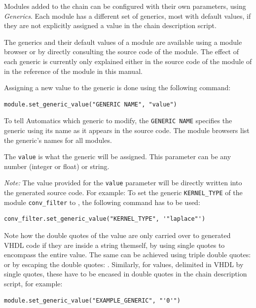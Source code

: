 Modules added to the chain can be configured with their own parameters, using \textit{Generics}.
Each module has a different set of generics, most with default values, if they are not explicitly assigned a value in the chain description script.

The generics and their default values of a module are available using a module browser or by directly consulting the source code of the module.
The effect of each generic is currently only explained either in the source code of the module of in the reference of the module in this manual.

Assigning a new value to the generic is done using the following command:
\begin{lstlisting}[style=AutomaticsPython]
module.set_generic_value("GENERIC NAME", "value")
\end{lstlisting}

To tell Automatics which generic to modify, the \texttt{GENERIC NAME} specifies the generic using its name as it appears in the source code.
The module browsers list the generic's names for all modules.

The \texttt{value} is what the generic will be assigned.
This parameter can be any number (integer or float) or string.

\emph{Note:}
The value provided for the \texttt{value} parameter will be directly written into the generated source code.
For example: To set the generic \texttt{KERNEL\_TYPE} of the module \texttt{conv\_filter} to , the following command has to be used:
\begin{lstlisting}[style=AutomaticsPython]
conv_filter.set_generic_value("KERNEL_TYPE", '"laplace"')
\end{lstlisting}

Note how the double quotes of the value  are only carried over to generated VHDL code if they are inside a string themself, by using single quotes to encompass the entire value.
The same can be achieved using triple double quotes:  or by escaping the double quotes: .
Similarly, for  values, delimited in VHDL by single quotes, these have to be encased in double quotes in the chain description script, for example:
\begin{lstlisting}[style=AutomaticsPython]
module.set_generic_value("EXAMPLE_GENERIC", "'0'")
\end{lstlisting}

